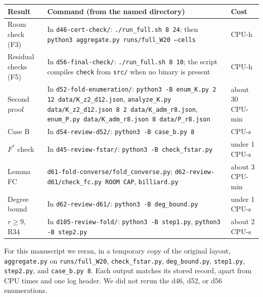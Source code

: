 \documentclass[11pt]{article}
\theoremstyle{definition}
\theoremstyle{remark}
\begin{document}
\begin{center}
\small
\begin{tabular}{@{}>{\raggedright\arraybackslash}p{}>{\raggedright\arraybackslash}p{}>{\raggedright\arraybackslash}p{}@{}}
\toprule
Result & Command (from the named directory) & Cost \\
\midrule
Room check (F3) & In \texttt{d46-cert-check/}: \texttt{./run\_full.sh 8 24}; then \texttt{python3 aggregate.py runs/full\_W20 --cells} & 24.4 CPU-h \\
Residual checks (F5) & In \texttt{d56-final-check/}: \texttt{./run\_full.sh 8 10}; the script compiles \texttt{check} from \texttt{src/} when no binary is present & 4.7 CPU-h \\
Second proof & In \texttt{d52-fold-enumeration/}: \texttt{python3 -B enum\_K.py 2 12 data/K\_z2\_d12.json}, \texttt{analyze\_K.py data/K\_z2\_d12.json 8 2 data/K\_adm\_r8.json}, \texttt{enum\_P.py data/K\_adm\_r8.json 8 data/P\_r8.json} & about 30 CPU-min \\
Case B & In \texttt{d54-review-d52/}: \texttt{python3 -B case\_b.py 8} & 21 CPU-s \\
$F^*$ check & In \texttt{d45-review-fstar/}: \texttt{python3 -B check\_fstar.py} & under 1 CPU-s \\
Lemma FC & \texttt{d61-fold-converse/fold\_converse.py}; \texttt{d62-review-d61/check\_fc.py ROOM CAP}, \texttt{billiard.py} & about 3 CPU-min \\
Degree bound & In \texttt{d62-review-d61/}: \texttt{python3 -B deg\_bound.py} & under 1 CPU-s \\
$r\ge 9$, R34 & In \texttt{d105-review-fold/}: \texttt{python3 -B step1.py}, \texttt{python3 -B step2.py} & about 2 CPU-s \\
\bottomrule
\end{tabular}
\end{center}

\begin{sloppypar}
For this manuscript we reran, in a temporary copy of the original layout,
\texttt{aggregate.py} on
\texttt{runs/full\_W20}, \texttt{check\_fstar.py}, \texttt{deg\_bound.py},
\texttt{step1.py}, \texttt{step2.py}, and \texttt{case\_b.py 8}. Each output
matches its stored record, apart from CPU times and one log header. We did not
rerun the d46, d52, or d56 enumerations.
\end{sloppypar}
\end{document}
